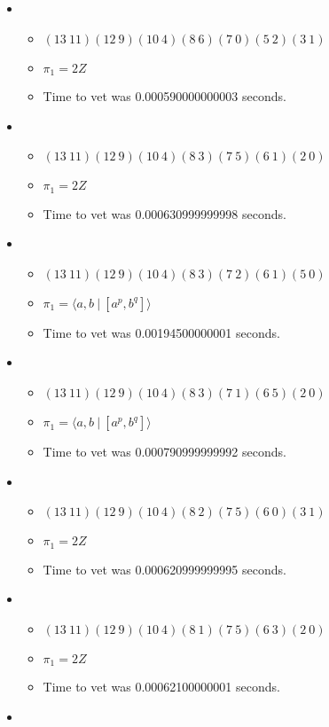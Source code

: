 \documentclass{article}
\begin{document}
\begin{itemize}
\item \begin{itemize}
      \item $(13\ 11)(12\ 9)(10\ 4)(8\ 6)(7\ 0)(5\ 2)(3\ 1)$
      \item $\pi_1 =2 Z$
      \item Time to vet was 0.000590000000003 seconds.
\end{itemize}
\item \begin{itemize}
      \item $(13\ 11)(12\ 9)(10\ 4)(8\ 3)(7\ 5)(6\ 1)(2\ 0)$
      \item $\pi_1 =2 Z$
      \item Time to vet was 0.000630999999998 seconds.
\end{itemize}
\item \begin{itemize}
      \item $(13\ 11)(12\ 9)(10\ 4)(8\ 3)(7\ 2)(6\ 1)(5\ 0)$
      \item $\pi_1 = \langle a,b\ |\ [a^p,b^q]\rangle$
      \item Time to vet was 0.00194500000001 seconds.
\end{itemize}
\item \begin{itemize}
      \item $(13\ 11)(12\ 9)(10\ 4)(8\ 3)(7\ 1)(6\ 5)(2\ 0)$
      \item $\pi_1 = \langle a,b\ |\ [a^p,b^q]\rangle$
      \item Time to vet was 0.000790999999992 seconds.
\end{itemize}
\item \begin{itemize}
      \item $(13\ 11)(12\ 9)(10\ 4)(8\ 2)(7\ 5)(6\ 0)(3\ 1)$
      \item $\pi_1 =2 Z$
      \item Time to vet was 0.000620999999995 seconds.
\end{itemize}
\item \begin{itemize}
      \item $(13\ 11)(12\ 9)(10\ 4)(8\ 1)(7\ 5)(6\ 3)(2\ 0)$
      \item $\pi_1 =2 Z$
      \item Time to vet was 0.00062100000001 seconds.
\end{itemize}
\item \begin{itemize}

\end{itemize}
\end{itemize}
\end{document}
